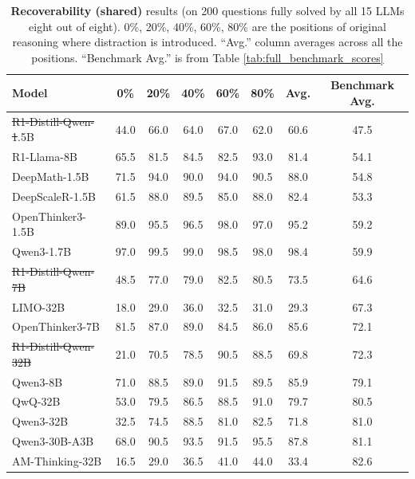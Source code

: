 \documentclass{article} %
\providecommand{\DIFaddtex}[1]{{\protect\color{blue}\uwave{#1}}} %
\providecommand{\DIFdeltex}[1]{{\protect\color{red}\sout{#1}}}                      %
\providecommand{\DIFaddFL}[1]{\DIFadd{#1}} %
\providecommand{\DIFdelFL}[1]{\DIFdel{#1}} %
\providecommand{\DIFaddbeginFL}{} %
\providecommand{\DIFaddendFL}{} %
\providecommand{\DIFdelbeginFL}{} %
\providecommand{\DIFdelendFL}{} %
\providecommand{\DIFadd}[1]{\texorpdfstring{\DIFaddtex{#1}}{#1}} %
\providecommand{\DIFdel}[1]{\texorpdfstring{\DIFdeltex{#1}}{}} %
\newcommand{\DIFscaledelfig}{0.5}
\newlength{\DIFdelgraphicswidth} %
\newlength{\DIFdelgraphicsheight} %
\newcommand{\DIFaddincludegraphics}[2][]{{\color{blue}\fbox{\DIFOincludegraphics[#1]{#2}}}} %
\newcommand{\DIFdelincludegraphics}[2][]{%
\sbox{\DIFdelgraphicsbox}{\DIFOincludegraphics[#1]{#2}}%
\settoboxwidth{\DIFdelgraphicswidth}{\DIFdelgraphicsbox} %
\settoboxtotalheight{\DIFdelgraphicsheight}{\DIFdelgraphicsbox} %
\scalebox{\DIFscaledelfig}{%
\parbox[b]{\DIFdelgraphicswidth}{\usebox{\DIFdelgraphicsbox}\\[-\baselineskip] \rule{\DIFdelgraphicswidth}{0em}}\llap{\resizebox{\DIFdelgraphicswidth}{\DIFdelgraphicsheight}{%
\setlength{\unitlength}{\DIFdelgraphicswidth}%
\begin{picture}(1,1)%
\thicklines\linethickness{2pt} %
{\color[rgb]{1,0,0}\put(0,0){\framebox(1,1){}}}%
{\color[rgb]{1,0,0}\put(0,0){\line( 1,1){1}}}%
{\color[rgb]{1,0,0}\put(0,1){\line(1,-1){1}}}%
\end{picture}%
}\hspace*{3pt}}} %
} %
\DeclareRobustCommand{\DIFaddbeginFL}{\DIFOaddbeginFL \let\includegraphics\DIFaddincludegraphics} %
\DeclareRobustCommand{\DIFaddendFL}{\DIFOaddendFL \let\includegraphics\DIFOincludegraphics} %
\DeclareRobustCommand{\DIFdelbeginFL}{\DIFOdelbeginFL \let\includegraphics\DIFdelincludegraphics} %
\DeclareRobustCommand{\DIFdelendFL}{\DIFOaddendFL \let\includegraphics\DIFOincludegraphics} %
\begin{document}
\label{sec:appendix_recoverability_test}
\begin{table}[ht!]
  \centering
  \begin{tabular}{lcccccc|c}
    \toprule
    \textbf{Model} & \textbf{0\%} & \textbf{20\%} & \textbf{40\%} & \textbf{60\%} & \textbf{80\%} & \textbf{Avg.} & \textbf{Benchmark Avg.} \\
    \midrule
    \DIFdelbeginFL \DIFdelFL{R1-Distill-Qwen-1}\DIFdelendFL \DIFaddbeginFL \DIFaddFL{R1-Qwen-1}\DIFaddendFL .5B    & 44.0 & 66.0 & 64.0 & 67.0 & 62.0 & 60.6 & 47.5 \\
    R1-Llama-8B             & 65.5 & 81.5 & 84.5 & 82.5 & 93.0 & 81.4 & 54.1 \\
    DeepMath-1.5B           & 71.5 & 94.0 & 90.0 & 94.0 & 90.5 & 88.0 & 54.8 \\
    DeepScaleR-1.5B         & 61.5 & 88.0 & 89.5 & 85.0 & 88.0 & 82.4 & 53.3 \\
    OpenThinker3-1.5B       & 89.0 & 95.5 & 96.5 & 98.0 & 97.0 & 95.2 & 59.2 \\
    Qwen3-1.7B              & 97.0 & 99.5 & 99.0 & 98.5 & 98.0 & 98.4 & 59.9 \\
    \midrule
    \DIFdelbeginFL \DIFdelFL{R1-Distill-Qwen-7B      }\DIFdelendFL \DIFaddbeginFL \DIFaddFL{R1-Qwen-7B      }\DIFaddendFL & 48.5 & 77.0 & 79.0 & 82.5 & 80.5 & 73.5 & 64.6 \\
    LIMO-32B                & 18.0 & 29.0 & 36.0 & 32.5 & 31.0 & 29.3 & 67.3 \\
    OpenThinker3-7B         & 81.5 & 87.0 & 89.0 & 84.5 & 86.0 & 85.6 & 72.1 \\
    \DIFdelbeginFL \DIFdelFL{R1-Distill-Qwen-32B     }\DIFdelendFL \DIFaddbeginFL \DIFaddFL{R1-Qwen-32B     }\DIFaddendFL & 21.0 & 70.5 & 78.5 & 90.5 & 88.5 & 69.8 & 72.3 \\
    \midrule
    Qwen3-8B                & 71.0 & 88.5 & 89.0 & 91.5 & 89.5 & 85.9 & 79.1 \\
    QwQ-32B                 & 53.0 & 79.5 & 86.5 & 88.5 & 91.0 & 79.7 & 80.5 \\
    Qwen3-32B               & 32.5 & 74.5 & 88.5 & 81.0 & 82.5 & 71.8 & 81.0 \\
    Qwen3-30B-A3B           & 68.0 & 90.5 & 93.5 & 91.5 & 95.5 & 87.8 & 81.1 \\
    AM-Thinking-32B      & 16.5 & 29.0 & 36.5 & 41.0 & 44.0  & 33.4 & 82.6 \\
    \bottomrule
  \end{tabular}
  \caption{\textbf{Recoverability (shared)} results (on 200 questions fully solved by all 15 LLMs eight out of eight). 0\%, 20\%, 40\%, 60\%, 80\% are the positions of original reasoning where distraction is introduced. ``Avg.'' column averages across all the positions. ``Benchmark Avg.'' is from Table \ref{tab:full_benchmark_scores}}
  \label{tab:recoverability_shared}
\end{table}
\end{document}
